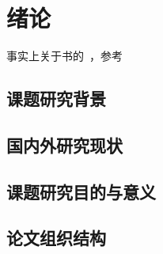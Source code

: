 \chapter{绪论}
\label{cha:introduction}
事实上关于书的~\cite{curtis2016aspectj}，参考~\cite{杨宝林2015基于}
\section{课题研究背景}
\section{国内外研究现状}
\section{课题研究目的与意义}
\section{论文组织结构}